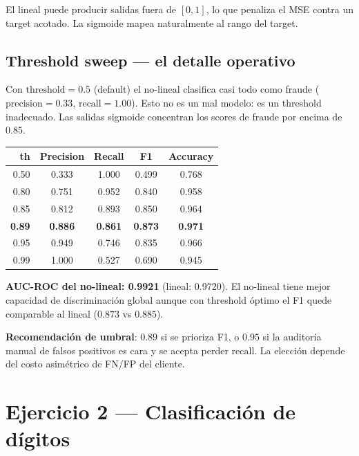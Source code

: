\documentclass[11pt,a4paper]{article}
\begin{document}
\begin{insight}
El lineal puede producir salidas fuera de \([0,1]\), lo que penaliza el MSE contra un target acotado. La sigmoide mapea naturalmente al rango del target.
\end{insight}

\subsection{Threshold sweep — el detalle operativo}

Con \(\text{threshold} = 0.5\) (default) el no-lineal clasifica casi todo como fraude (\(\text{precision} = 0.33\), \(\text{recall} = 1.00\)). Esto no es un mal modelo: es un threshold inadecuado. Las salidas sigmoide concentran los scores de fraude por encima de \(0.85\).

\begin{center}
\small
\begin{tabular}{@{}rcccc@{}}
\toprule
\textbf{th} & \textbf{Precision} & \textbf{Recall} & \textbf{F1} & \textbf{Accuracy} \\
\midrule
0.50 & 0.333 & 1.000 & 0.499 & 0.768 \\
0.80 & 0.751 & 0.952 & 0.840 & 0.958 \\
0.85 & 0.812 & 0.893 & 0.850 & 0.964 \\
\rowcolor{accent2!10}
\textbf{0.89} & \textbf{0.886} & \textbf{0.861} & \textbf{0.873} & \textbf{0.971} \\
0.95 & 0.949 & 0.746 & 0.835 & 0.966 \\
0.99 & 1.000 & 0.527 & 0.690 & 0.945 \\
\bottomrule
\end{tabular}
\end{center}

\textbf{AUC-ROC del no-lineal: 0.9921} (lineal: 0.9720). El no-lineal tiene mejor capacidad de discriminación global aunque con threshold óptimo el F1 quede comparable al lineal (\(0.873\) vs \(0.885\)).

\begin{takeaway}
\textbf{Recomendación de umbral}: \textbf{\(0.89\)} si se prioriza F1, o \textbf{\(0.95\)} si la auditoría manual de falsos positivos es cara y se acepta perder recall. La elección depende del costo asimétrico de FN/FP del cliente.
\end{takeaway}

\section{Ejercicio 2 — Clasificación de dígitos}\label{sec:ej2}
\end{document}
